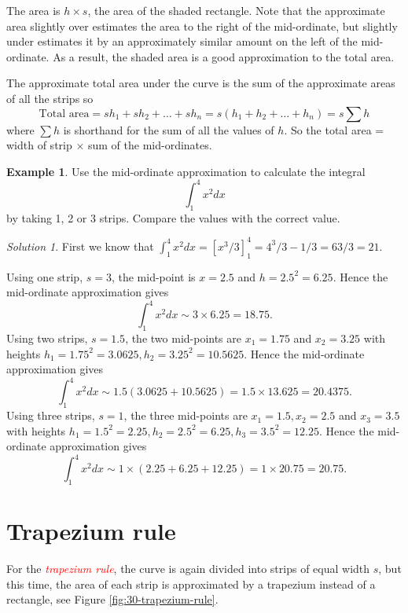 \documentclass[
  11pt,
  oneside]{book}
\newcommand{\slide}{}
\theoremstyle{definition}
\theoremstyle{definition}
\newtheorem{example}{Example}[chapter]
\theoremstyle{definition}
\theoremstyle{definition}
\theoremstyle{remark}
\newtheorem*{solution}{Solution}
\begin{document}
The area is \(h \times s\), the area of the shaded rectangle. Note that the approximate area slightly over estimates the area to the right of the mid-ordinate, but slightly under estimates it by an approximately similar amount on the left of the mid-ordinate. As a result, the shaded area is a good approximation to the total area.

The approximate total area under the curve is the sum of the approximate areas of all the strips so
\[
\text{Total area} = sh_1 + sh_2 + \ldots + sh_n = s(h_1 + h_2 + \ldots + h_n) = s\sum h
\]
where \(\sum h\) is shorthand for the sum of all the values of \(h\). So the total area = width of strip \(\times\) sum of the mid-ordinates.

\slide

\begin{example}
Use the mid-ordinate approximation to calculate the integral
\[
\int_1^4x^2dx
\]
by taking 1, 2 or 3 strips. Compare the values with the correct value.
\end{example}

\begin{solution}
First we know that \(\displaystyle\int_1^4 x^2 dx = [x^3/3]_1^4 = 4^3/3-1/3 = 63/3 = 21\).

Using one strip, \(s=3\), the mid-point is \(x=2.5\) and \(h=2.5^2 = 6.25\). Hence the mid-ordinate approximation gives
\[
\int_1^4 x^2 dx \sim 3\times 6.25 = 18.75.
\]
Using two strips, \(s=1.5\), the two mid-points are \(x_1=1.75\) and \(x_2=3.25\) with heights \(h_1=1.75^2=3.0625, h_2=3.25^2=10.5625\). Hence the mid-ordinate approximation gives
\[
\int_1^4 x^2 dx \sim 1.5(3.0625+10.5625)=1.5\times13.625 = 20.4375.
\]
Using three strips, \(s=1\), the three mid-points are \(x_1=1.5, x_2=2.5\) and \(x_3=3.5\) with heights \(h_1=1.5^2=2.25, h_2=2.5^2=6.25, h_3=3.5^2=12.25\). Hence the mid-ordinate approximation gives
\[
\int_1^4 x^2 dx \sim 1\times(2.25+6.25+12.25)=1\times20.75 = 20.75.
\]
\end{solution}

\slide

\section{Trapezium rule}\label{trapezium-rule}

For the \textcolor{red}{\em trapezium rule}, the curve is again divided into strips of equal width \(s\), but this time, the area of each strip is approximated by a trapezium instead of a rectangle, see Figure \ref{fig:30-trapezium-rule}.
\end{document}
